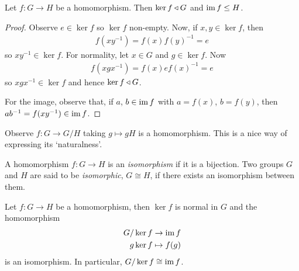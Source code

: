 \documentclass{../../template/note}
\begin{document}
    \begin{proposition}
        Let $f: G \to H$ be a homomorphism. Then $\ker f \triangleleft G$ and $\operatorname{im} f \leq H$.
    \end{proposition}
    
    \begin{proof}
        Observe $e \in \ker f$ so $\ker f$ non-empty. Now, if $x, y \in \ker f$, then
        \begin{align*}
            f(xy^{-1}) = f(x)f(y)^{-1} = e
        \end{align*}
        so $xy^{-1} \in \ker f$. For normality, let $x \in G$ and $g \in \ker f$. Now
        \begin{align*}
            f(xgx^{-1}) = f(x) e f(x)^{-1} = e
        \end{align*}
        so $xgx^{-1} \in \ker f$ and hence $\ker f \triangleleft G$.
        
        For the image, observe that, if $a$, $b \in \operatorname{im} f$ with $a = f(x)$, $b = f(y)$, then $ab^{-1} = f(xy^{-1}) \in \operatorname{im} f$.
    \end{proof}
    
    \begin{remark*}
        Observe $f: G \to G/H$ taking $g \mapsto gH$ is a homomorphism. This is a nice way of expressing its `naturalness'.
    \end{remark*}
    
    \begin{definition}
        A homomorphism $f: G \to H$ is an \emph{isomorphism} if it is a bijection. Two groups $G$ and $H$ are said to be \emph{isomorphic}, $G \cong H$, if there exists an isomorphism between them.
    \end{definition}
    
    \begin{theorem}
        Let $f: G \to H$ be a homomorphism, then $\ker f$ is normal in $G$ and the homomorphism
        \begin{align*}
            G/\ker f &\to \operatorname{im} f \\
            g \ker f &\mapsto f(g)
        \end{align*}
        is an isomorphism. In particular, $G/\ker f \cong \operatorname{im} f$.                
    \end{theorem}
    
\end{document}
